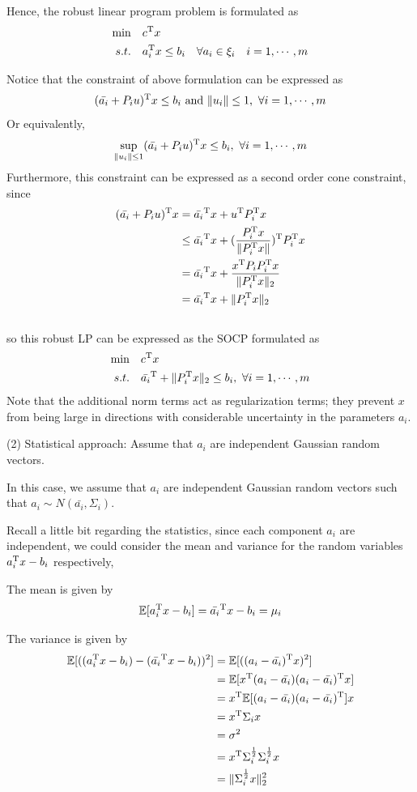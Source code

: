 Hence, the robust linear program problem is formulated as
\begin{align*}
\min\quad &c^{{\rm T}}x\\
s.t. \quad&a_i^{{\rm T}}x\leq b_i\quad \forall a_i \in \xi_i \quad i = 1,\cdots,m
\end{align*}

Notice that the constraint of above formulation can be expressed as
$$(\bar{a_i} + P_iu)^{\trans}x\leq b_i\ \text{and}\ \Vert u_i\Vert \leq 1,\ \forall i = 1,\cdots,m$$
Or equivalently,
$$\sup_{\Vert u_i\Vert \leq 1}(\bar{a_i} + P_iu)^{{\rm T}}x\leq b_i,\ \forall i = 1,\cdots,m$$
Furthermore, this constraint can be expressed as a second order cone constraint, since
\begin{align*}
(\bar{a_i} + P_iu)^{{\rm T}}x &= \bar{a_i}^{{\rm T}}x + u^{{\rm T}}P_i^{{\rm T}}x \\
&\leq \bar{a_i}^{{\rm T}}x + (\frac{P_i^{{\rm T}}x}{\Vert P_i^{{\rm T}}x\Vert})^{{\rm T}}P_i^{{\rm T}}x\\
&= \bar{a_i}^{{\rm T}}x + \frac{x^{{\rm T}}P_iP_i^{{\rm T}}x}{\Vert P_i^{{\rm T}}x\Vert_2}\\
&= \bar{a_i}^{{\rm T}}x + \Vert P_i^{{\rm T}}x\Vert_2
\end{align*}\\
so this robust LP can be expressed as the SOCP formulated as
\begin{align*}
\min\quad &c^{{\rm T}}x\\
s.t. \quad&\bar{a_i}^{{\rm T}} + \Vert P_i^{{\rm T}} x\Vert_2\leq b_i,\ \forall i = 1,\cdots,m
\end{align*}
Note that the additional norm terms act as regularization terms; they prevent $x$ from being large in directions with considerable uncertainty in the parameters $a_i$.


\vspace{0.3cm}
(2) Statistical approach: Assume that $a_i$ are independent Gaussian random vectors.

In this case, we assume that $a_i$ are independent Gaussian random vectors such that $a_i \sim N(\bar{a_i}, \Sigma_i)$.

Recall a little bit regarding the statistics, since each component $a_i$ are independent, we could consider the mean and variance for the random variables $a_i^{{\rm T}}x - b_i$ respectively,

The mean is given by
$$\mathbb{E}[a_i^{{\rm T}}x - b_i] = \bar{a_i}^{{\rm T}}x - b_i = \mu_i$$

The variance is given by
\begin{align*}
\mathbb{E}[((a_i^{{\rm T}}x - b_i) - (\bar{a_i}^{{\rm T}}x - b_i))^2] 
&= \mathbb{E}[((a_i - \bar{a_i})^{{\rm T}}x)^2]\\
&= \mathbb{E}[x^{{\rm T}}(a_i - \bar{a_i})(a_i - \bar{a_i})^{{\rm T}}x] \\
&= x^{{\rm T}}\mathbb{E}[(a_i - \bar{a_i})(a_i - \bar{a_i})^{{\rm T}}]x\\
&= x^{{\rm T}}\Sigma_i x \\
&= \sigma^2\\
&= x^{{\rm T}} \Sigma_i^{\frac{1}{2}}\Sigma_i^{\frac{1}{2}} x\\
&= \Vert \Sigma_i^{\frac{1}{2}} x\Vert^2_2
\end{align*}

